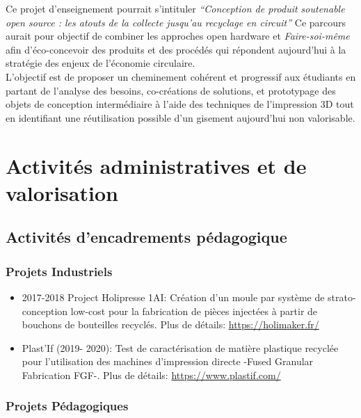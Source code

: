 \documentclass[
  12pt,
  oneside]{book}
\begin{document}
Ce projet d'enseignement pourrait s'intituler \emph{``Conception de produit soutenable open source : les atouts de la collecte jusqu'au recyclage en circuit''}
Ce parcours aurait pour objectif de combiner les approches open hardware et \emph{Faire-soi-même} afin d'éco-concevoir des produits et des procédés qui répondent aujourd'hui à la stratégie des enjeux de l'économie circulaire.\\
L'objectif est de proposer un cheminement cohérent et progressif aux étudiants en partant de l'analyse des besoins, co-créations de solutions, et prototypage des objets de conception intermédiaire à l'aide des techniques de l'impression 3D tout en identifiant une réutilisation possible d'un gisement aujourd'hui non valorisable.

\hypertarget{activituxe9s-administratives-et-de-valorisation}{%
\chapter{Activités administratives et de valorisation}\label{activituxe9s-administratives-et-de-valorisation}}

\hypertarget{activituxe9s-dencadrements-puxe9dagogique}{%
\section{Activités d'encadrements pédagogique}\label{activituxe9s-dencadrements-puxe9dagogique}}

\hypertarget{projets-industriels}{%
\subsection{Projets Industriels}\label{projets-industriels}}

\begin{itemize}
\item
  2017-2018 Project Holipresse 1AI: Création d'un moule par système de strato-conception low-cost pour la fabrication de pièces injectées à partir de bouchons de bouteilles recyclés.
  Plus de détails: \url{https://holimaker.fr/}
\item
  Plast'If (2019- 2020): Test de caractérisation de matière plastique recyclée pour l'utilisation des machines d'impression directe -Fused Granular Fabrication FGF-.
  Plus de détails: \url{https://www.plastif.com/}
\end{itemize}

\hypertarget{projets-puxe9dagogiques}{%
\subsection{Projets Pédagogiques}\label{projets-puxe9dagogiques}}
\end{document}
